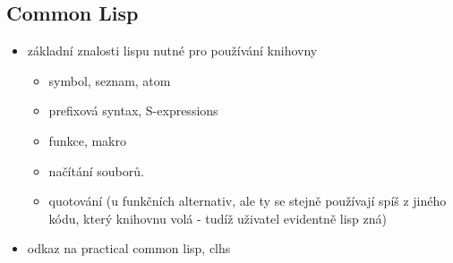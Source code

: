\subsection{Common Lisp}
\begin{itemize}
  \item základní znalosti lispu nutné pro používání knihovny
  \begin{itemize}
    \item symbol, seznam, atom
    \item prefixová syntax, S-expressions
    \item funkce, makro
    \item načítání souborů.
    \item quotování (u funkčních alternativ, ale ty se stejně používají spíš z jiného
      kódu, který knihovnu volá - tudíž uživatel evidentně lisp zná)
  \end{itemize}
  \item odkaz na practical common lisp, clhs
\end{itemize}
